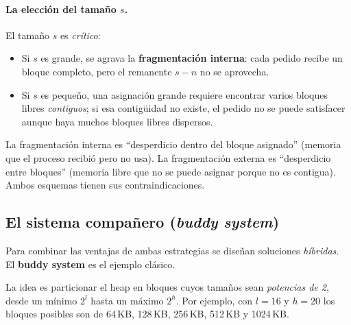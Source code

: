\documentclass[11pt,a4paper]{article}
\begin{document}
\paragraph{La elección del tamaño \texorpdfstring{$s$}{s}.}
El tamaño $s$ es \emph{crítico}:

\begin{itemize}[leftmargin=*]
    \item Si $s$ es grande, se agrava la \textbf{fragmentación interna}:
        cada pedido recibe un bloque completo, pero el remanente
        $s - n$ no se aprovecha.
    \item Si $s$ es pequeño, una asignación grande requiere encontrar
        varios bloques libres \emph{contiguos}; si esa contigüidad no
        existe, el pedido no se puede satisfacer aunque haya muchos
        bloques libres dispersos.
\end{itemize}

\begin{idea}
La fragmentación interna es ``desperdicio dentro del bloque asignado''
(memoria que el proceso recibió pero no usa). La fragmentación externa
es ``desperdicio entre bloques'' (memoria libre que no se puede
asignar porque no es contigua). Ambos esquemas tienen sus
contraindicaciones.
\end{idea}

\subsection{El sistema compañero (\emph{buddy system})}

Para combinar las ventajas de ambas estrategias se diseñan soluciones
\emph{híbridas}. El \textbf{buddy system} es el ejemplo clásico.

La idea es particionar el heap en bloques cuyos tamaños sean
\emph{potencias de 2}, desde un mínimo $2^l$ hasta un máximo $2^h$. Por
ejemplo, con $l = 16$ y $h = 20$ los bloques posibles son de 64\,KB,
128\,KB, 256\,KB, 512\,KB y 1024\,KB.
\end{document}
